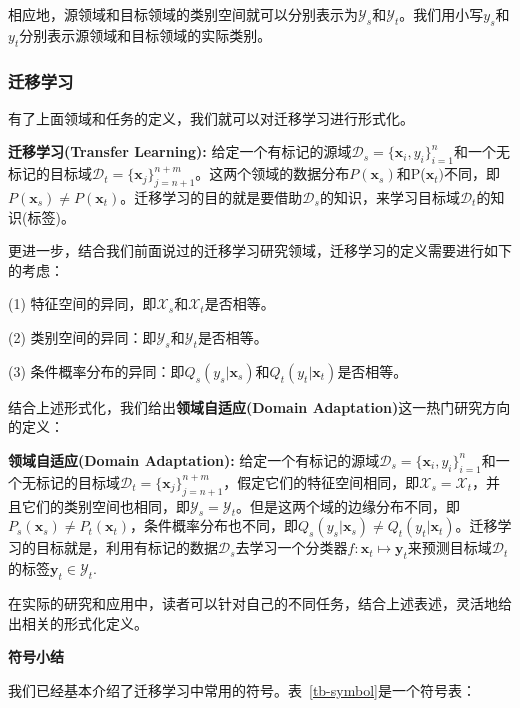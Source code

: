 相应地，源领域和目标领域的类别空间就可以分别表示为$\mathcal{Y}_s$和$\mathcal{Y}_t$。我们用小写$y_s$和$y_t$分别表示源领域和目标领域的实际类别。

\subsubsection{迁移学习}

有了上面领域和任务的定义，我们就可以对迁移学习进行形式化。

\textbf{迁移学习(Transfer Learning):} 给定一个有标记的源域$\mathcal{D}_s=\{\mathbf{x}_{i},y_{i}\}^n_{i=1}$和一个无标记的目标域$\mathcal{D}_t=\{\mathbf{x}_{j}\}^{n+m}_{j=n+1}$。这两个领域的数据分布$P(\mathbf{x}_s)$和P($\mathbf{x}_t)$不同，即$P(\mathbf{x}_s) \ne P(\mathbf{x}_t)$。迁移学习的目的就是要借助$\mathcal{D}_s$的知识，来学习目标域$\mathcal{D}_t$的知识(标签)。

更进一步，结合我们前面说过的迁移学习研究领域，迁移学习的定义需要进行如下的考虑：

(1) 特征空间的异同，即$\mathcal{X}_s$和$\mathcal{X}_t$是否相等。

(2) 类别空间的异同：即$\mathcal{Y}_s$和$\mathcal{Y}_t$是否相等。

(3) 条件概率分布的异同：即$Q_s(y_s|\mathbf{x}_s)$和$Q_t(y_t|\mathbf{x}_t)$是否相等。

结合上述形式化，我们给出\textbf{领域自适应(Domain Adaptation)}这一热门研究方向的定义：

\textbf{领域自适应(Domain Adaptation):} 给定一个有标记的源域$\mathcal{D}_s=\{\mathbf{x}_{i},y_{i}\}^n_{i=1}$和一个无标记的目标域$\mathcal{D}_t=\{\mathbf{x}_{j}\}^{n+m}_{j=n+1}$，假定它们的特征空间相同，即$\mathcal{X}_s = \mathcal{X}_t$，并且它们的类别空间也相同，即$\mathcal{Y}_s = \mathcal{Y}_t$。但是这两个域的边缘分布不同，即$P_s(\mathbf{x}_s) \ne P_t(\mathbf{x}_t)$，条件概率分布也不同，即$Q_s(y_s|\mathbf{x}_s) \ne Q_t(y_t|\mathbf{x}_t)$。迁移学习的目标就是，利用有标记的数据$\mathcal{D}_s$去学习一个分类器$f:\mathbf{x}_t \mapsto \mathbf{y}_t$来预测目标域$\mathcal{D}_t$的标签$\mathbf{y}_t \in \mathcal{Y}_t$.

在实际的研究和应用中，读者可以针对自己的不同任务，结合上述表述，灵活地给出相关的形式化定义。

\textbf{符号小结}

我们已经基本介绍了迁移学习中常用的符号。表~\ref{tb-symbol}是一个符号表：

